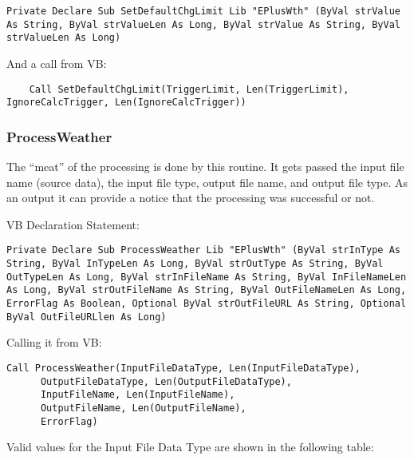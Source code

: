 \begin{lstlisting}
Private Declare Sub SetDefaultChgLimit Lib "EPlusWth" (ByVal strValue As String, ByVal strValueLen As Long, ByVal strValue As String, ByVal strValueLen As Long)
\end{lstlisting}

And a call from VB:

\begin{lstlisting}
    Call SetDefaultChgLimit(TriggerLimit, Len(TriggerLimit), IgnoreCalcTrigger, Len(IgnoreCalcTrigger))
\end{lstlisting}

\subsubsection{ProcessWeather}\label{processweather}

The ``meat'' of the processing is done by this routine. It gets passed the input file name (source data), the input file type, output file name, and output file type. As an output it can provide a notice that the processing was successful or not.

VB Declaration Statement:

\begin{lstlisting}
Private Declare Sub ProcessWeather Lib "EPlusWth" (ByVal strInType As String, ByVal InTypeLen As Long, ByVal strOutType As String, ByVal OutTypeLen As Long, ByVal strInFileName As String, ByVal InFileNameLen As Long, ByVal strOutFileName As String, ByVal OutFileNameLen As Long, ErrorFlag As Boolean, Optional ByVal strOutFileURL As String, Optional ByVal OutFileURLlen As Long)
\end{lstlisting}

Calling it from VB:

\begin{lstlisting}
Call ProcessWeather(InputFileDataType, Len(InputFileDataType),
      OutputFileDataType, Len(OutputFileDataType),
      InputFileName, Len(InputFileName),
      OutputFileName, Len(OutputFileName),
      ErrorFlag)
\end{lstlisting}

Valid values for the Input File Data Type are shown in the following table:

